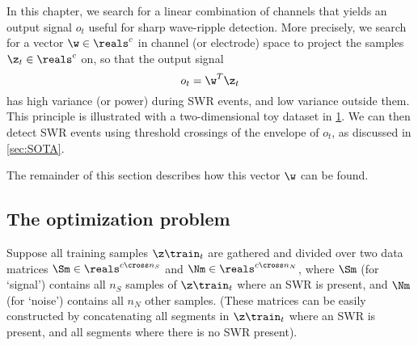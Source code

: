 \label{sec:GEVD-optim}

In this chapter, we search for a linear combination of channels that yields an output signal $o_t$ useful for sharp wave-ripple detection. More precisely, we search for a vector $\w \in \reals^c$ in channel (or electrode) space to project the samples $\z_t \in \reals^c$ on, so that the output signal
%
\begin{equation}
\label{eq:linear}
o_t = \w^T \z_t
\end{equation}
%
has high variance (or power) during SWR events, and low variance outside them. This principle is illustrated with a two-dimensional toy dataset in \cref{fig:GEVec_principle}. We can then detect SWR events using threshold crossings of the envelope of $o_t$, as discussed in \cref{sec:SOTA}.

\begin{figure}
\label{fig:GEVec_principle}
\end{figure}

The remainder of this section describes how this vector $\w$ can be found.



\subsection{The optimization problem}

Suppose all training samples $\z\train_t$ are gathered and divided over two data matrices $\Sm \in \reals^{c \cross n_S}$ and $\Nm \in \reals^{c \cross n_N}$, where $\Sm$ (for `signal') contains all $n_S$ samples of $\z\train_t$ where an SWR is present, and $\Nm$ (for `noise') contains all $n_N$ other samples. (These matrices can be easily constructed by concatenating all segments in $\z\train_t$ where an SWR is present, and all segments where there is no SWR present).

